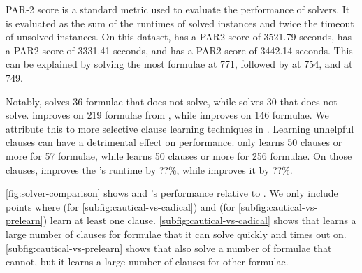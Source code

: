 PAR-2 score is a standard metric used to evaluate the performance of solvers.
It is evaluated as the sum of the runtimes of solved instances and twice the timeout of unsolved instances. On this dataset, \cadical has a PAR2-score of 3521.79 seconds, \prelearn has a PAR2-score of 3331.41 seconds, and \tool has a PAR2-score of 3442.14 seconds. This can be explained by \prelearn solving the most formulae at 771, followed by \tool at 754, and \cadical at 749.

Notably, \tool solves 36 formulae that \cadical does not solve, while \prelearn solves 30 that \cadical does not solve. \tool improves on 219 formulae from \cadical, while \prelearn improves on 146 formulae. We attribute this to more selective \pr clause learning techniques in \tool. Learning unhelpful \pr clauses can have a detrimental effect on performance. \tool only learns 50 \pr clauses or more for 57 formulae, while \prelearn learns 50 \pr clauses or more for 256 formulae. On those clauses, \tool improves the \cadical's runtime by ??\%, while \prelearn improves it by ??\%.

\autoref{fig:solver-comparison} shows \tool and \cadical's performance relative to \cadical. We only include points where \tool (for \autoref{subfig:cautical-vs-cadical}) and \prelearn (for \autoref{subfig:cautical-vs-prelearn}) learn at least one \pr clause. \autoref{subfig:cautical-vs-cadical} shows that \tool learns a large number of \pr clauses for formulae that it can solve quickly and \cadical times out on. \autoref{subfig:cautical-vs-prelearn} shows that \prelearn also solve a number of formulae that \tool cannot, but it learns a large number of \pr clauses for other formulae.








